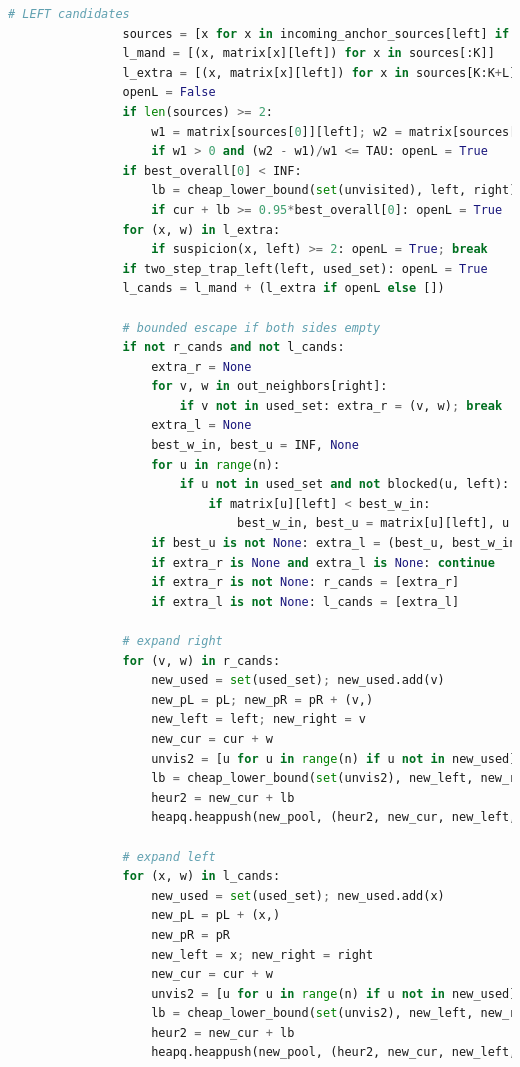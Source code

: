 \documentclass[sn-mathphys]{article}
\theoremstyle{thmstyleone}%
\theoremstyle{thmstyletwo}%
\theoremstyle{thmstylethree}%
\begin{document}
\begin{appendices}
\begin{lstlisting}[language=Python]
                # LEFT candidates
                sources = [x for x in incoming_anchor_sources[left] if x not in used_set]
                l_mand = [(x, matrix[x][left]) for x in sources[:K]]
                l_extra = [(x, matrix[x][left]) for x in sources[K:K+L]] if len(sources) > K else []
                openL = False
                if len(sources) >= 2:
                    w1 = matrix[sources[0]][left]; w2 = matrix[sources[1]][left]
                    if w1 > 0 and (w2 - w1)/w1 <= TAU: openL = True
                if best_overall[0] < INF:
                    lb = cheap_lower_bound(set(unvisited), left, right)
                    if cur + lb >= 0.95*best_overall[0]: openL = True
                for (x, w) in l_extra:
                    if suspicion(x, left) >= 2: openL = True; break
                if two_step_trap_left(left, used_set): openL = True
                l_cands = l_mand + (l_extra if openL else [])

                # bounded escape if both sides empty
                if not r_cands and not l_cands:
                    extra_r = None
                    for v, w in out_neighbors[right]:
                        if v not in used_set: extra_r = (v, w); break
                    extra_l = None
                    best_w_in, best_u = INF, None
                    for u in range(n):
                        if u not in used_set and not blocked(u, left):
                            if matrix[u][left] < best_w_in:
                                best_w_in, best_u = matrix[u][left], u
                    if best_u is not None: extra_l = (best_u, best_w_in)
                    if extra_r is None and extra_l is None: continue
                    if extra_r is not None: r_cands = [extra_r]
                    if extra_l is not None: l_cands = [extra_l]

                # expand right
                for (v, w) in r_cands:
                    new_used = set(used_set); new_used.add(v)
                    new_pL = pL; new_pR = pR + (v,)
                    new_left = left; new_right = v
                    new_cur = cur + w
                    unvis2 = [u for u in range(n) if u not in new_used]
                    lb = cheap_lower_bound(set(unvis2), new_left, new_right)
                    heur2 = new_cur + lb
                    heapq.heappush(new_pool, (heur2, new_cur, new_left, new_right, frozenset(new_used), new_pL, new_pR))

                # expand left
                for (x, w) in l_cands:
                    new_used = set(used_set); new_used.add(x)
                    new_pL = pL + (x,)
                    new_pR = pR
                    new_left = x; new_right = right
                    new_cur = cur + w
                    unvis2 = [u for u in range(n) if u not in new_used]
                    lb = cheap_lower_bound(set(unvis2), new_left, new_right)
                    heur2 = new_cur + lb
                    heapq.heappush(new_pool, (heur2, new_cur, new_left, new_right, frozenset(new_used), new_pL, new_pR))


\end{lstlisting}
\end{appendices}
\end{document}
